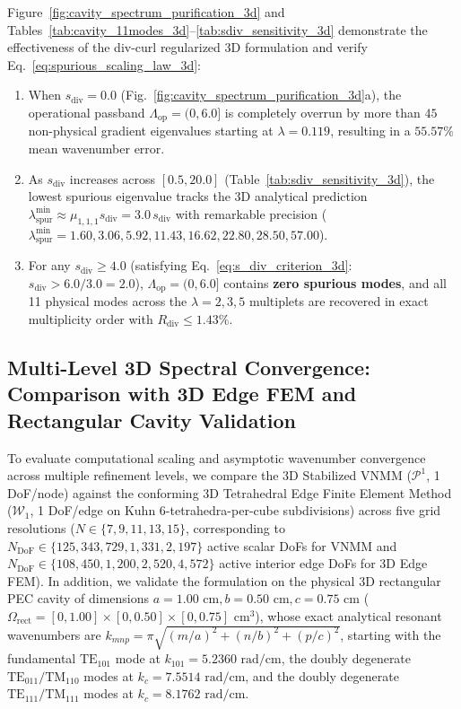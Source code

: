 \documentclass[preprint,12pt]{elsarticle}
\begin{document}
Figure~\ref{fig:cavity_spectrum_purification_3d} and Tables~\ref{tab:cavity_11modes_3d}--\ref{tab:sdiv_sensitivity_3d} demonstrate the effectiveness of the div-curl regularized 3D formulation and verify Eq.~\eqref{eq:spurious_scaling_law_3d}:
\begin{enumerate}
    \item When $s_{\text{div}} = 0.0$ (Fig.~\ref{fig:cavity_spectrum_purification_3d}a), the operational passband $\Lambda_{\text{op}} = (0, 6.0]$ is completely overrun by more than $45$ non-physical gradient eigenvalues starting at $\lambda = 0.119$, resulting in a $55.57\%$ mean wavenumber error.
    \item As $s_{\text{div}}$ increases across $[0.5, 20.0]$ (Table~\ref{tab:sdiv_sensitivity_3d}), the lowest spurious eigenvalue tracks the 3D analytical prediction $\lambda_{\text{spur}}^{\min} \approx \mu_{1,1,1}s_{\text{div}} = 3.0\,s_{\text{div}}$ with remarkable precision ($\lambda_{\text{spur}}^{\min} = 1.60, 3.06, 5.92, 11.43, 16.62, 22.80, 28.50, 57.00$).
    \item For any $s_{\text{div}} \ge 4.0$ (satisfying Eq.~\eqref{eq:s_div_criterion_3d}: $s_{\text{div}} > 6.0 / 3.0 = 2.0$), $\Lambda_{\text{op}} = (0, 6.0]$ contains \textbf{zero spurious modes}, and all 11 physical modes across the $\lambda = 2, 3, 5$ multiplets are recovered in exact multiplicity order with $R_{\text{div}} \le 1.43\%$.
\end{enumerate}


\subsection{Multi-Level 3D Spectral Convergence: Comparison with 3D Edge FEM and Rectangular Cavity Validation}
\label{subsec:sec5_6_efem_comparison}

To evaluate computational scaling and asymptotic wavenumber convergence across multiple refinement levels, we compare the 3D Stabilized VNMM ($\mathcal{P}^1$, 1 DoF/node) against the conforming 3D Tetrahedral Edge Finite Element Method ($\mathcal{W}_1$, 1 DoF/edge on Kuhn 6-tetrahedra-per-cube subdivisions) across five grid resolutions ($N \in \{7, 9, 11, 13, 15\}$, corresponding to $N_{\text{DoF}} \in \{125, 343, 729, 1{,}331, 2{,}197\}$ active scalar DoFs for VNMM and $N_{\text{DoF}} \in \{108, 450, 1{,}200, 2{,}520, 4{,}572\}$ active interior edge DoFs for 3D Edge FEM). In addition, we validate the formulation on the physical 3D rectangular PEC cavity of dimensions $a = 1.00\text{ cm}, b = 0.50\text{ cm}, c = 0.75\text{ cm}$ ($\Omega_{\text{rect}} = [0, 1.00]\times[0, 0.50]\times[0, 0.75]\text{ cm}^3$), whose exact analytical resonant wavenumbers are $k_{mnp} = \pi\sqrt{(m/a)^2 + (n/b)^2 + (p/c)^2}$, starting with the fundamental $\text{TE}_{101}$ mode at $k_{101} = 5.2360\text{ rad/cm}$, the doubly degenerate $\text{TE}_{011}/\text{TM}_{110}$ modes at $k_c = 7.5514\text{ rad/cm}$, and the doubly degenerate $\text{TE}_{111}/\text{TM}_{111}$ modes at $k_c = 8.1762\text{ rad/cm}$.
\end{document}
